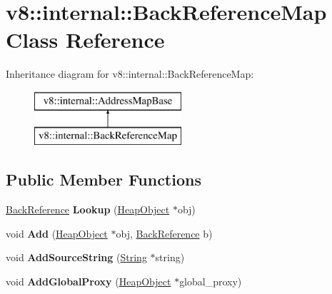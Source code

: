 \hypertarget{classv8_1_1internal_1_1_back_reference_map}{}\section{v8\+:\+:internal\+:\+:Back\+Reference\+Map Class Reference}
\label{classv8_1_1internal_1_1_back_reference_map}
Inheritance diagram for v8\+:\+:internal\+:\+:Back\+Reference\+Map\+:\begin{figure}[H]
\begin{center}
\leavevmode
\includegraphics[height=2.000000cm]{classv8_1_1internal_1_1_back_reference_map}
\end{center}
\end{figure}
\subsection*{Public Member Functions}
\begin{DoxyCompactItemize}
\item 
\hyperlink{classv8_1_1internal_1_1_back_reference}{Back\+Reference} {\bfseries Lookup} (\hyperlink{classv8_1_1internal_1_1_heap_object}{Heap\+Object} $\ast$obj)\hypertarget{classv8_1_1internal_1_1_back_reference_map_aef7ea8f8be36d101101074526cccc968}{}\label{classv8_1_1internal_1_1_back_reference_map_aef7ea8f8be36d101101074526cccc968}

\item 
void {\bfseries Add} (\hyperlink{classv8_1_1internal_1_1_heap_object}{Heap\+Object} $\ast$obj, \hyperlink{classv8_1_1internal_1_1_back_reference}{Back\+Reference} b)\hypertarget{classv8_1_1internal_1_1_back_reference_map_a797e8d0fa759a51889c8c6b4647622a9}{}\label{classv8_1_1internal_1_1_back_reference_map_a797e8d0fa759a51889c8c6b4647622a9}

\item 
void {\bfseries Add\+Source\+String} (\hyperlink{classv8_1_1internal_1_1_string}{String} $\ast$string)\hypertarget{classv8_1_1internal_1_1_back_reference_map_a6e48c9da47cab604dc798ca9683011c6}{}\label{classv8_1_1internal_1_1_back_reference_map_a6e48c9da47cab604dc798ca9683011c6}

\item 
void {\bfseries Add\+Global\+Proxy} (\hyperlink{classv8_1_1internal_1_1_heap_object}{Heap\+Object} $\ast$global\+\_\+proxy)\hypertarget{classv8_1_1internal_1_1_back_reference_map_aa10e4b76f8c1b218a4c97f28a21d977a}{}\label{classv8_1_1internal_1_1_back_reference_map_aa10e4b76f8c1b218a4c97f28a21d977a}

\end{DoxyCompactItemize}

